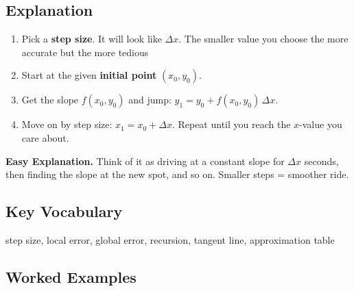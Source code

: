 \documentclass{article}
\begin{document}
\subsection*{Explanation}
\begin{enumerate}
  \item Pick a \textbf{step size}. It will look like \(\Delta x\). The smaller value you choose the more accurate but the more tedious
  \item Start at the given \textbf{initial point} \((x_0,y_0)\).
  \item Get the slope \(f(x_0,y_0)\) and jump:\;
        \(y_1 = y_0 + f(x_0,y_0)\,\Delta x\).
  \item Move on by step size:\;
        \(x_1 = x_0 + \Delta x\).\;
        Repeat until you reach the \(x\)-value you care about.
\end{enumerate}

\medskip
\noindent
\textbf{Easy Explanation.} Think of it as driving at a constant slope for \(\Delta x\) seconds, then finding the slope at the new spot, and so on. Smaller steps = smoother ride.

\subsection*{Key Vocabulary}
step size, local error, global error, recursion, tangent line, approximation table

\subsection*{Worked Examples}
\end{document}
